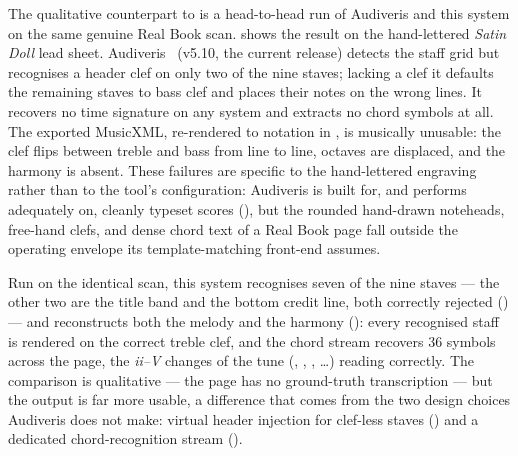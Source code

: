 The qualitative counterpart to  is a
head-to-head run of Audiveris and this system on the same genuine Real
Book scan.   shows the result on the
hand-lettered \textit{Satin Doll} lead sheet.
Audiveris~\cite{audiverisAudiveris} (v5.10, the current release)
detects the staff grid but recognises a header clef on only two of the
nine staves; lacking a clef it defaults the remaining staves to bass
clef and places their notes on the wrong lines. It recovers no time
signature on any system and extracts no chord symbols at all.
The exported MusicXML, re-rendered to notation in
, is musically unusable: the clef flips
between treble and bass from line to line, octaves are displaced, and
the harmony is absent.
These failures are specific to the hand-lettered engraving rather than
to the tool's configuration: Audiveris is built for, and performs
adequately on, cleanly typeset scores (), but
the rounded hand-drawn noteheads, free-hand clefs, and dense chord text
of a Real Book page fall outside the operating envelope its
template-matching front-end assumes.

Run on the identical scan, this system recognises seven of the nine
staves --- the other two are the title band and the bottom credit line,
both correctly rejected () --- and reconstructs
both the melody and the harmony ():
every recognised staff is rendered on the correct treble clef, and the
chord stream recovers \num{36} symbols across the page, the
\textit{ii--V} changes of the tune (, ,
, \dots) reading correctly.
The comparison is qualitative --- the page has no ground-truth
transcription --- but the output is far more usable, a difference that
comes from the two design choices Audiveris does not
make: virtual header injection for clef-less staves
() and a dedicated chord-recognition stream
().

